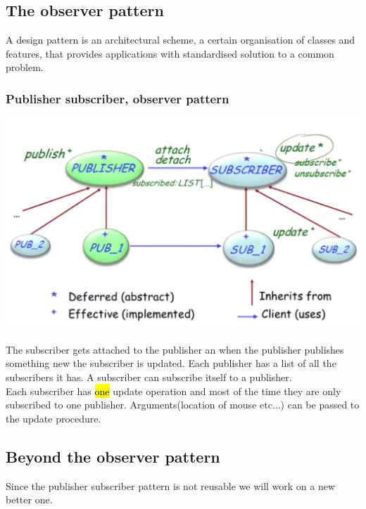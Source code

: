 \documentclass[11pt]{article}
\begin{document}
\subsection{The observer pattern}
A design pattern is an architectural scheme, a certain organisation of classes and features, that provides applications with standardised solution to a common problem.\\
\subsubsection{Publisher subscriber, observer pattern}
\begin{center}
	\includegraphics[width = 15cm]{Eprog/pub}
\end{center}

The subscriber gets attached to the publisher an when the publisher publishes something new the subscriber is updated. Each publisher has a list of all the subscribers it has. A subscriber can subscribe itself to a publisher.\\Each subscriber has \hl{one} update operation and most of the time they are only subscribed to one publisher. Arguments(location of mouse etc...) can be passed to the update procedure.
\subsection{Beyond the observer pattern}
Since the publisher subscriber pattern is not reusable we will work on a new better one.
\end{document}
